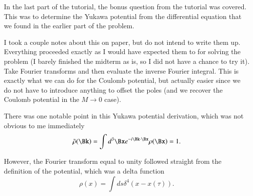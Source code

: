 %
%


In the last part of the tutorial, the bonus question from the tutorial was covered.  This was to determine the Yukawa potential from the differential equation that we found in the earlier part of the problem.

I took a couple notes about this on paper, but do not intend to write them up.  Everything proceeded exactly as I would have expected them to for solving the problem (I barely finished the midterm as is, so I did not have a chance to try it).  Take Fourier transforms and then evaluate the inverse Fourier integral.  This is exactly what we can do for the Coulomb potential, but actually easier since we do not have to introduce anything to offset the poles (and we recover the Coulomb potential in the \(M \rightarrow 0\) case).

There was one notable point in this Yukawa potential derivation, which was not obvious to me immediately
%
\begin{equation}\label{eqn:relativisticElectrodynamicsT8:350}
\tilde{\rho}(\Bk) = \int d^3 \Bx e^{-i \Bk \cdot \Bx} \rho(\Bx) = 1.
\end{equation}

However, the Fourier transform equal to unity followed straight from the definition of the potential, which was a delta function
%
\begin{equation}\label{eqn:relativisticElectrodynamicsT8:340}
\rho(x) = \int ds \delta^4(x - x(\tau)).
\end{equation}
